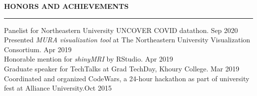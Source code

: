 \documentclass[a4paper]{article}
\newcommand{\myline}{\par
  \kern2pt %
  \hrule height 0.5pt
  \kern2pt %
}
\newcommand{\mybullet}{
	\indent 
  \textbullet \hspace*{2mm}
}
\begin{document}
	
		
	
	\noindent
	{\large \textbf{HONORS AND ACHIEVEMENTS}}
	\myline 
	\smallskip

    \mybullet Panelist for Northeastern University UNCOVER COVID datathon. \hfill Sep 2020 \\
    \mybullet Presented \textit{MURA visualization tool} at The Northeastern University 
    Visualization Consortium. \hfill Apr 2019 \\
    \mybullet Honorable mention for \textit{shinyMRI} by RStudio. \hfill Apr 2019 \\
    \mybullet Graduate speaker for TechTalks at Grad TechDay, Khoury College. \hfill Mar 2019 \\
		\mybullet Coordinated and organized CodeWars, a 24-hour hackathon as part of 
		university fest at Alliance University.\hfill Oct 2015\\
\end{document}
